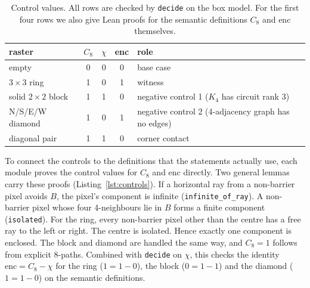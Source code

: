 \documentclass[11pt]{article}
\theoremstyle{definition}
\theoremstyle{remark}
\begin{document}
\begin{table}[h]
\centering
\begin{tabular}{lcccl}
\toprule
raster & $C_8$ & $\chi$ & enc & role\\
\midrule
empty & 0 & 0 & 0 & base case\\
$3\times3$ ring & 1 & 0 & 1 & witness\\
solid $2\times2$ block & 1 & 1 & 0 & negative control 1 ($K_4$ has circuit rank 3)\\
N/S/E/W diamond & 1 & 0 & 1 & negative control 2 (4-adjacency graph has no edges)\\
diagonal pair & 1 & 1 & 0 & corner contact\\
\bottomrule
\end{tabular}
\caption{Control values. All rows are checked by \texttt{decide} on the box
model. For the first four rows we also give Lean proofs for the semantic
definitions $C_8$ and $\mathrm{enc}$ themselves.}
\label{tab:controls}
\end{table}

To connect the controls to the definitions that the statements actually use, each
module proves the control values for $C_8$ and $\mathrm{enc}$ directly. Two
general lemmas carry these proofs (Listing~\ref{lst:controls}). If a horizontal
ray from a non-barrier pixel avoids $B$, the pixel's component is infinite
(\texttt{infinite\_of\_ray}). A non-barrier pixel whose four 4-neighbours lie in
$B$ forms a finite component (\texttt{isolated}). For the ring, every non-barrier
pixel other than the centre has a free ray to the left or right. The centre is
isolated. Hence exactly one component is enclosed. The block and diamond are
handled the same way, and $C_8=1$ follows from explicit 8-paths. Combined with
\texttt{decide} on $\chi$, this checks the identity $\mathrm{enc}=C_8-\chi$ for
the ring ($1=1-0$), the block ($0=1-1$) and the diamond ($1=1-0$) on the
semantic definitions.
\end{document}
